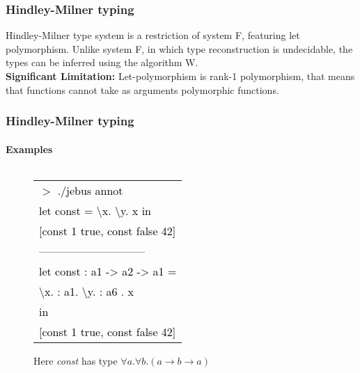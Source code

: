 \documentclass[xcolor=table]{beamer}
\newcommand{\tab}{\hspace*{1.2em}}
\begin{document}
\begin{frame}
\frametitle{Hindley-Milner typing}
\begin{block}
{ 
Hindley-Milner type system is a restriction of system F, featuring let polymorphism. Unlike system F, in which type reconstruction is undecidable, 
the types can be inferred using the algorithm W.
\\
\textbf{Significant Limitation: }
Let-polymorphism is rank-1 polymorphism, that means that functions cannot take as arguments polymorphic functions.
}

\end{block}
\end{frame}

\begin{frame}
\frametitle{Hindley-Milner typing}
\framesubtitle{Examples}
\begin{block}
{ 
     \begin{columns}[t] %
     \begin{column}[T]{5cm} %
          \begin{figure}[h!]
				 \begin{small}
				 \begin{tabular}{l}
				 \textcolor{black}{
			      $>$ ./jebus annot} \\
			      \textcolor{black}{let const = \textbackslash x. \textbackslash y. x in} \\ \relax
			      \textcolor{black}{[const 1 true, const false 42]} \\
			      \textcolor{black}{-----------------------------} \\
			      \textcolor{black}{let const : a1 -> a2 -> a1 =} \\
			      \textcolor{black}{\tab \textbackslash x. : a1. \textbackslash y. : a6 . x}  \\
			      \textcolor{black}{in} \\ \relax
			      \textcolor{black}{\tab [const 1 true, const false 42]}
			      \end{tabular}	
				 \end{small}
			  \caption{Here \textit{const} has type $\forall a. \forall b. (a \rightarrow b \rightarrow a)$}
		 \end{figure}
     \end{column}
     \begin{column}[T]{5cm} %
		 \begin{figure}[h!]

\end{figure}
\end{column}
\end{columns}}
\end{block}
\end{frame}
\end{document}
